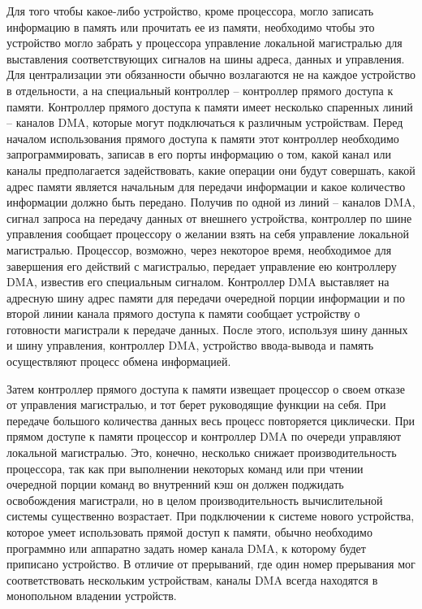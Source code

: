 Для того чтобы какое-либо устройство, кроме процессора, могло записать информацию в память или прочитать ее из памяти, необходимо чтобы это устройство могло забрать у процессора управление локальной магистралью для выставления соответствующих сигналов на шины адреса, данных и управления. Для централизации эти обязанности обычно возлагаются не на каждое устройство в отдельности, а на специальный контроллер – контроллер прямого доступа к памяти. Контроллер прямого доступа к памяти имеет несколько спаренных линий – каналов DMA, которые могут подключаться к различным устройствам. Перед началом использования прямого доступа к памяти этот контроллер необходимо запрограммировать, записав в его порты информацию о том, какой канал или каналы предполагается задействовать, какие операции они будут совершать, какой адрес памяти является начальным для передачи информации и какое количество информации должно быть передано. Получив по одной из линий – каналов DMA, сигнал запроса на передачу данных от внешнего устройства, контроллер по шине управления сообщает процессору о желании взять на себя управление локальной магистралью. Процессор, возможно, через некоторое время, необходимое для завершения его действий с магистралью, передает управление ею контроллеру DMA, известив его специальным сигналом. Контроллер DMA выставляет на адресную шину адрес памяти для передачи очередной порции информации и по второй линии канала прямого доступа к памяти сообщает устройству о готовности магистрали к передаче данных. После этого, используя шину данных и шину управления, контроллер DMA, устройство ввода-вывода и память осуществляют процесс обмена информацией.

Затем контроллер прямого доступа к памяти извещает процессор о своем отказе от управления магистралью, и тот берет руководящие функции на себя. При передаче большого количества данных весь процесс повторяется циклически. При прямом доступе к памяти процессор и контроллер DMA по очереди управляют локальной магистралью. Это, конечно, несколько снижает производительность процессора, так как при выполнении некоторых команд или при чтении очередной порции команд во внутренний кэш он должен поджидать освобождения магистрали, но в целом производительность вычислительной системы существенно возрастает. При подключении к системе нового устройства, которое умеет использовать прямой доступ к памяти, обычно необходимо программно или аппаратно задать номер канала DMA, к которому будет приписано устройство. В отличие от прерываний, где один номер прерывания мог соответствовать нескольким устройствам, каналы DMA всегда находятся в монопольном владении устройств.

